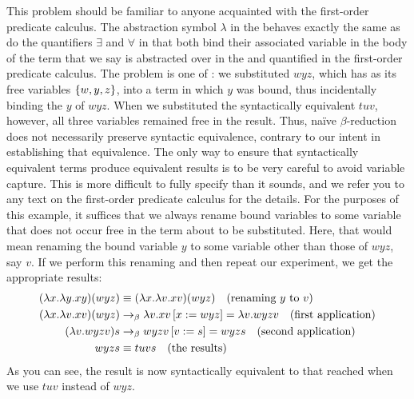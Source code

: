 This problem should be familiar to anyone acquainted with the first-order predicate calculus. The abstraction symbol $\lambda$ in the \lambdacalc behaves exactly the same as do the quantifiers $\exists$ and $\forall$ in that both bind their associated variable in the body of the term that we say is abstracted over in the \lambdacalc and quantified in the first-order predicate calculus. The problem is one of : we substituted $w y z$, which has as its free variables $\left\{ w, y, z \right\}$, into a term in which $y$ was bound, thus incidentally binding the $y$ of $w y z$. When we substituted the syntactically equivalent $t u v$, however, all three variables remained free in the result. Thus, na\"{i}ve $\beta$-reduction does not necessarily preserve syntactic equivalence, contrary to our intent in establishing that equivalence. The only way to ensure that syntactically equivalent terms produce equivalent results is to be very careful to avoid variable capture. This is more difficult to fully specify than it sounds, and we refer you to any text on the first-order predicate calculus for the details. For the purposes of this example, it suffices that we always rename bound variables to some variable that does not occur free in the term about to be substituted. Here, that would mean renaming the bound variable $y$ to some variable other than those of $w y z$, say $v$. If we perform this renaming and then repeat our experiment, we get the appropriate results:
\begin{align*}
(\lambda x. \lambda y. x y) (w y z) &\equiv (\lambda x. \lambda v. x v) (w y z) \quad \text{(renaming $y$ to $v$)}
\\
(\lambda x. \lambda v. x v) (w y z) &\betared \replace{x}{w y z}{\lambda v. xv} = \lambda v. w y z v
\quad \text{(first application)}
\\
(\lambda v. w y z v) s &\betared \replace{v}{s}{w y z v} = w y z s \quad \text{(second application)}
\\
w y z s &\equiv t u v s \quad \text{(the results)}
\end{align*}
As you can see, the result is now syntactically equivalent to that reached when we use $tuv$ instead of $wyz$.

